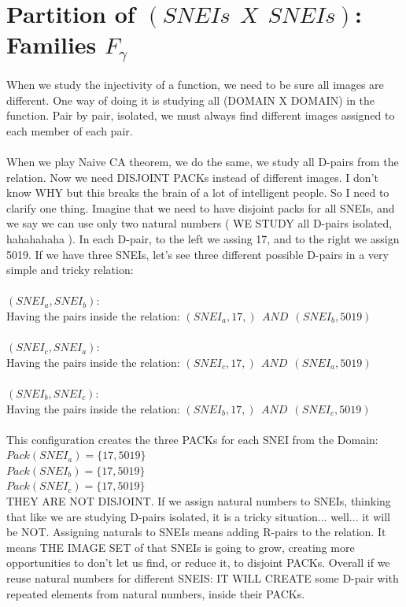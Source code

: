 \chapter{Partition of $(SNEIs\:\:X\:\:SNEIs)$: Families $F_{\gamma}$}

	\noindent
	When we study the injectivity of a function, we need to be sure all images are different. One way of doing it is studying all (DOMAIN X DOMAIN) in the function. Pair by pair, isolated, we must always find different images assigned to each member of each pair.
	\\\\
	
	\noindent
	When we play Naive CA theorem, we do the same, we study all D-pairs from the relation. Now we need DISJOINT PACKs instead of different images. I don't know WHY but this breaks the brain of a lot of intelligent people. So I need to clarify one thing. Imagine that we need to have disjoint packs for all SNEIs, and we say we can use only two natural numbers ( WE STUDY all D-pairs isolated, hahahahaha ). In each D-pair, to the left we assing 17, and to the right we assign 5019. If we have three SNEIs, let's see three different possible D-pairs in a very simple and tricky relation:\\\\
	$(SNEI_{a}, SNEI_{b}):$\\
	Having the pairs inside the relation: $(SNEI_{a}, 17,) \:\:AND\:\: (SNEI_{b}, 5019)$\\\\
	$(SNEI_{c}, SNEI_{a}):$\\
	Having the pairs inside the relation: $(SNEI_{c}, 17,) \:\:AND\:\: (SNEI_{a}, 5019)$\\\\
	$(SNEI_{b}, SNEI_{c}):$\\
	Having the pairs inside the relation: $(SNEI_{b}, 17,) \:\:AND\:\: (SNEI_{c}, 5019)$\\\\
	This configuration creates the three PACKs for each SNEI from the Domain:\\
	$Pack(SNEI_{a}) = \{17,5019\}$\\
	$Pack(SNEI_{b}) = \{17,5019\}$\\
	$Pack(SNEI_{c}) = \{17,5019\}$\\
	THEY ARE NOT DISJOINT. If we assign natural numbers to SNEIs, thinking that like we are studying D-pairs isolated, it is a tricky situation... well... it will be NOT. Assigning naturals to SNEIs means adding R-pairs to the relation. It means THE IMAGE SET of that SNEIs is going to grow, creating more opportunities to don't let us find, or reduce it, to disjoint PACKs. Overall if we reuse natural numbers for different SNEIS: IT WILL CREATE some D-pair with repeated elements from natural numbers, inside their PACKs.
	\\\\
	
